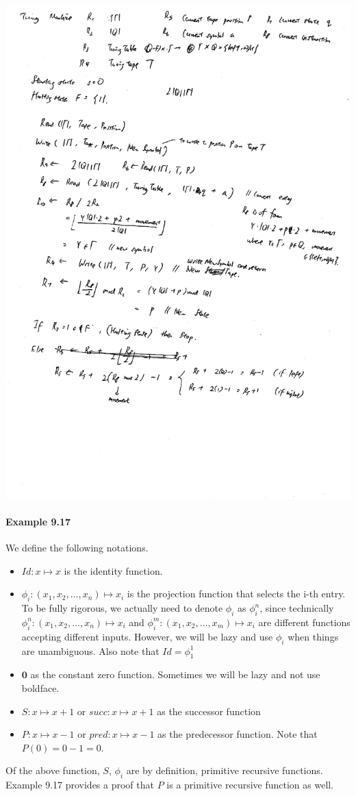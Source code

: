 \documentclass{article}
\begin{document}
\includegraphics[scale=0.7]{9_11}

\paragraph{Example 9.17}\mbox{}
We define the following notations.
\begin{itemize}
	\item $Id: x\mapsto x$ is the identity function.
	\item $\phi_i: (x_1,x_2,\dots, x_n)\mapsto x_i$ is the projection function that selects the i-th entry. To be fully rigorous, we actually need to denote $\phi_i$ as $\phi_i^n$, since technically $\phi_i^n: (x_1,x_2,\dots, x_n)\mapsto x_i$ and $\phi_i^m: (x_1,x_2,\dots, x_m)\mapsto x_i$ are different functions accepting different inputs. However, we will be lazy and use $\phi_i$ when things are unambiguous. Also note that $Id=\phi_1^1$
	\item $\mathbf{0}$ as the constant zero function. Sometimes we will be lazy and not use boldface.
	\item $S:x\mapsto x+1$ or $succ:x\mapsto x+1$ as the successor function
	\item $P:x\mapsto x-1$ or $pred:x\mapsto x-1$ as the predecessor function. Note that $P(0)=0-1=0$.
\end{itemize}
Of the above function, $S$, $\phi_i$ are by definition, primitive recursive functions. Example 9.17 provides a proof that $P$ is a primitive recursive function as well.
\end{document}
